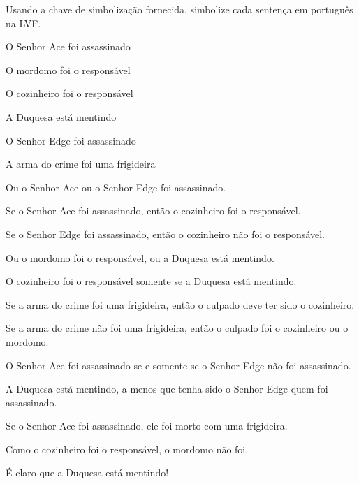 \problempart Usando a chave de simbolização fornecida, simbolize cada sentença em português na LVF.
\begin{ekey}
\item[A] O Senhor Ace foi assassinado
\item[B] O mordomo foi o responsável
\item[C] O cozinheiro foi o responsável
\item[D] A Duquesa está mentindo
\item[E] O Senhor Edge foi assassinado
\item[F] A arma do crime foi uma frigideira
\end{ekey}
\begin{compactlist}
\item Ou o Senhor Ace ou o Senhor Edge foi assassinado.
\item[] 
\item Se o Senhor Ace foi assassinado, então o cozinheiro foi o responsável.
\item[] 
\item Se o Senhor Edge foi assassinado, então o cozinheiro não foi o responsável.
\item[] 
\item Ou o mordomo foi o responsável, ou a Duquesa está mentindo.
\item[] 
\item O cozinheiro foi o responsável somente se a Duquesa está mentindo.
\item[] 
\item Se a arma do crime foi uma frigideira, então o culpado deve ter sido o cozinheiro.
\item[] 
\item Se a arma do crime não foi uma frigideira, então o culpado foi o cozinheiro ou o mordomo.
\item[] 
\item O Senhor Ace foi assassinado se e somente se o Senhor Edge não foi assassinado.
\item[] 
\item A Duquesa está mentindo, a menos que tenha sido o Senhor Edge quem foi assassinado.
\item[] 
\item Se o Senhor Ace foi assassinado, ele foi morto com uma frigideira.
\item[] 
\item Como o cozinheiro foi o responsável, o mordomo não foi.
\item[] 
\item É claro que a Duquesa está mentindo!
\item[] 
\end{compactlist}

